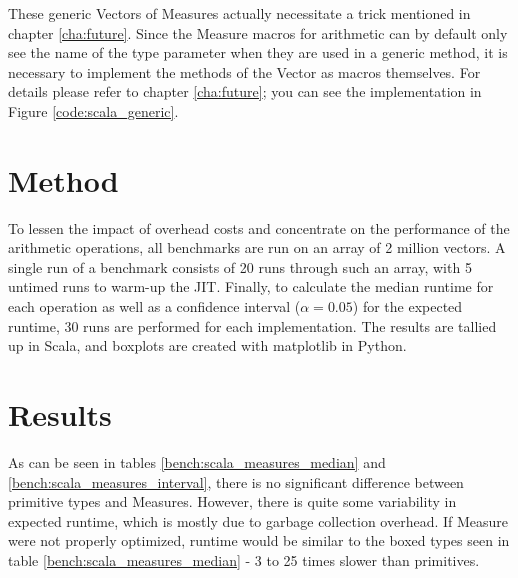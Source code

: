 \documentclass[12pt,oneside,a4paper]{scrbook}
\begin{document}
These generic Vectors of Measures actually necessitate a trick mentioned in chapter \ref{cha:future}. Since the Measure macros for arithmetic can by default only see the name of the type parameter when they are used in a generic method, it is necessary to implement the methods of the Vector as macros themselves. For details please refer to chapter \ref{cha:future}; you can see the implementation in Figure \ref{code:scala_generic}.

\section{Method}
To lessen the impact of overhead costs and concentrate on the performance of the arithmetic operations, all benchmarks are run on an array of 2 million vectors. A single run of a benchmark consists of 20 runs through such an array, with 5 untimed runs to warm-up the JIT. Finally, to calculate the median runtime for each operation as well as a confidence interval ($\alpha = 0.05$) for the expected runtime, 30 runs are performed for each implementation. The results are tallied up in Scala, and boxplots are created with matplotlib in Python.

\section{Results}
As can be seen in tables \ref{bench:scala_measures_median} and \ref{bench:scala_measures_interval}, there is no significant difference between primitive types and Measures. However, there is quite some variability in expected runtime, which is mostly due to garbage collection overhead. If Measure were not properly optimized, runtime would be similar to the boxed types seen in table \ref{bench:scala_measures_median} - 3 to 25 times slower than primitives.
\end{document}
